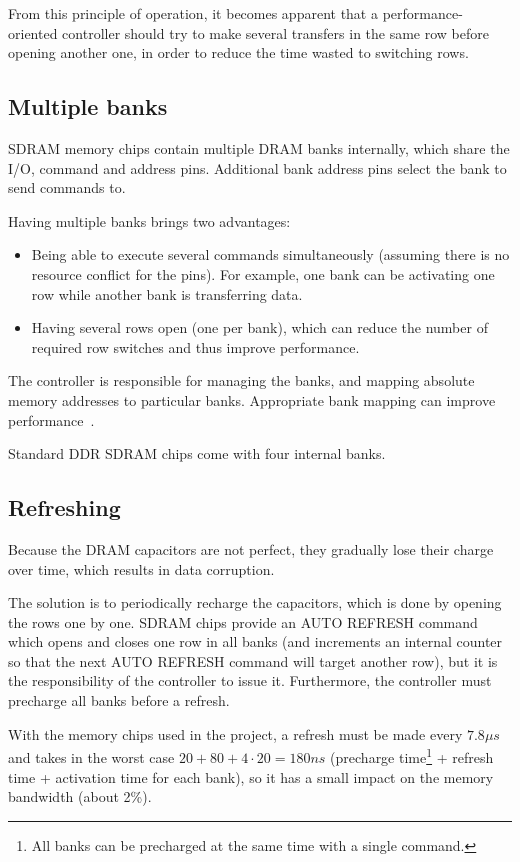 \documentclass[a4paper,11pt]{kthesis}
\begin{document}
From this principle of operation, it becomes apparent that a performance-oriented controller should try to make several transfers in the same row before opening another one, in order to reduce the time wasted to switching rows.

\subsection{Multiple banks}
SDRAM memory chips contain multiple DRAM banks internally, which share the I/O, command and address pins. Additional bank address pins select the bank to send commands to.

Having multiple banks brings two advantages:
\begin{itemize}
\item Being able to execute several commands simultaneously (assuming there is no resource conflict for the pins). For example, one bank can be activating one row while another bank is transferring data.
\item Having several rows open (one per bank), which can reduce the number of required row switches and thus improve performance.
\end{itemize}

The controller is responsible for managing the banks, and mapping absolute memory addresses to particular banks. Appropriate bank mapping can improve performance~\cite{pagemode}.

Standard DDR SDRAM chips come with four internal banks.

\subsection{Refreshing}
Because the DRAM capacitors are not perfect, they gradually lose their charge over time, which results in data corruption.

The solution is to periodically recharge the capacitors, which is done by opening the rows one by one. SDRAM chips provide an AUTO REFRESH command which opens and closes one row in all banks (and increments an internal counter so that the next AUTO REFRESH command will target another row), but it is the responsibility of the controller to issue it. Furthermore, the controller must precharge all banks before a refresh.

With the memory chips used in the project, a refresh must be made every $7.8\unit{\mu s}$ and takes in the worst case $20+80+4 \cdot 20=180\unit{ns}$ (precharge time\footnote{All banks can be precharged at the same time with a single command.} + refresh time + activation time for each bank), so it has a small impact on the memory bandwidth (about 2\%).
\end{document}
